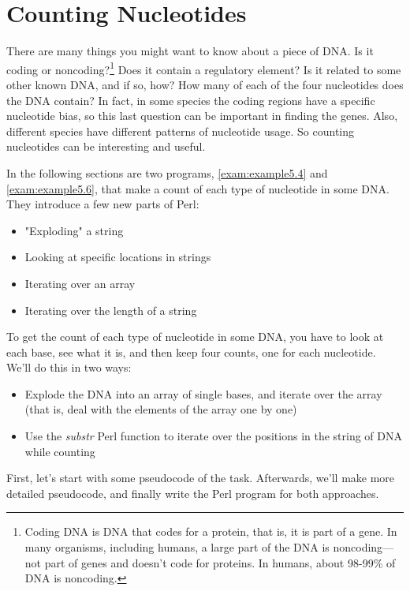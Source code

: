 \section{Counting Nucleotides}
There are many things you might want to know about a piece of DNA. Is it coding or noncoding?\footnote{Coding DNA is DNA that codes for a protein, that is, it is part of a gene. In many organisms, including humans, a large part of the DNA is noncoding—not part of genes and doesn't code for proteins. In humans, about 98-99\% of DNA is noncoding.} Does it contain a regulatory element? Is it related to some other known DNA, and if so, how? How many of each of the four nucleotides does the DNA contain? In fact, in some species the coding regions have a specific nucleotide bias, so this last question can be important in finding the genes. Also, different species have different patterns of nucleotide usage. So counting nucleotides can be interesting and useful.

In the following sections are two programs, \autoref{exam:example5.4} and \autoref{exam:example5.6}, that make a count of each type of nucleotide in some DNA. They introduce a few new parts of Perl:

\begin{itemize}
  \item "Exploding" a string
  \item Looking at specific locations in strings
  \item Iterating over an array
  \item Iterating over the length of a string
\end{itemize}

To get the count of each type of nucleotide in some DNA, you have to look at each base, see what it is, and then keep four counts, one for each nucleotide. We'll do this in two ways:

\begin{itemize}
  \item Explode the DNA into an array of single bases, and iterate over the array (that is, deal with the elements of the array one by one)
  \item Use the \textit{substr} Perl function to iterate over the positions in the string of DNA while counting
\end{itemize}

First, let's start with some pseudocode of the task. Afterwards, we'll make more detailed pseudocode, and finally write the Perl program for both approaches.

